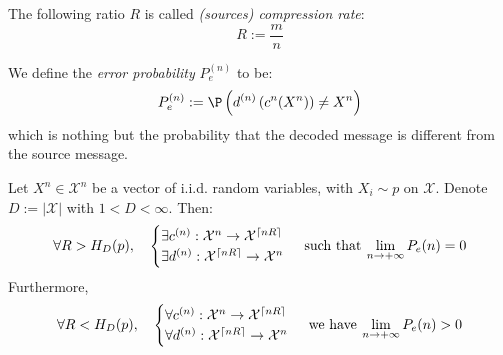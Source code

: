 \documentclass{../cs-classes/cs-classes}
\newcommand*{\X}{\mathcal{X}}
\begin{document}
\begin{definition}
    The following ratio $R$ is called \emph{(sources) compression rate}:
    \begin{equation}
        \label{eq:compression-rate}
        R:=\frac{m}{n}
    \end{equation}
\end{definition}

\begin{definition}
    We define the \emph{error probability} $P_e^{(n)}$ to be:
    \begin{equation}
        P_e^{(n)}:=\P\left(d^{(n)}\left(c^{n}(X^n)\right)\neq X^n\right)
    \end{equation}
    which is nothing but the probability that the decoded message is different from the source message.
\end{definition}

\begin{theorem}
    \label{th:shannon-first}
    Let $X^n\in \X^n$ be a vector of i.i.d. random variables, with $X_i\sim p$ on $\X$. Denote $D:=|\X|$ with $1<D<\infty$. Then:
    \begin{equation}
        \label{eq:shannon-ft-1}
        \forall R>H_D(p), \quad \begin{cases}
            \exists c^{(n)}:\X^n\to \X^{\lceil nR\rceil} \\
            \exists d^{(n)}:\X^{\lceil nR\rceil}\to \X^n
        \end{cases}\: \textnormal{such that}\: \lim_{n\to+\infty}P_e(n)=0
    \end{equation}
    Furthermore,
    \begin{equation}
        \label{eq:shannon-ft-2}
        \forall R<H_D(p), \quad \begin{cases}
            \forall c^{(n)}:\X^n\to \X^{\lceil nR\rceil} \\
            \forall d^{(n)}:\X^{\lceil nR\rceil}\to \X^n
        \end{cases}\: \textnormal{we have}\: \lim_{n\to+\infty}P_e(n)>0
    \end{equation}
\end{theorem}
\end{document}

